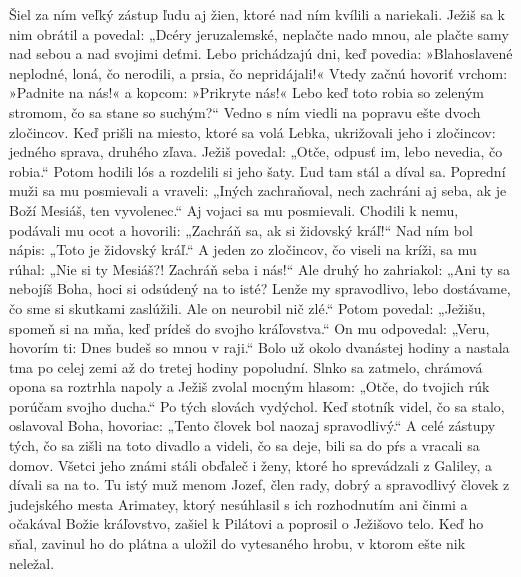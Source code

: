 Šiel za ním veľký zástup ľudu aj žien, ktoré nad ním kvílili a nariekali. Ježiš sa k nim obrátil a povedal: „Dcéry jeruzalemské, neplačte nado mnou, ale plačte samy nad sebou a nad svojimi deťmi. Lebo prichádzajú dni, keď povedia: »Blahoslavené neplodné, loná, čo nerodili, a prsia, čo nepridájali!«
Vtedy začnú hovoriť vrchom: »Padnite na nás!« a kopcom: »Prikryte nás!« 
Lebo keď toto robia so zeleným stromom, čo sa stane so suchým?“
Vedno s ním viedli na popravu ešte dvoch zločincov.
\versseparator
Keď prišli na miesto, ktoré sa volá Lebka, ukrižovali jeho i zločincov: jedného sprava, druhého zľava. Ježiš povedal: „Otče, odpusť im, lebo nevedia, čo robia.“
Potom hodili lós a rozdelili si jeho šaty. 
Ľud tam stál a díval sa. Poprední muži sa mu posmievali a vraveli: „Iných zachraňoval, nech zachráni aj seba, ak je Boží Mesiáš, ten vyvolenec.“ Aj vojaci sa mu posmievali. Chodili k nemu, podávali mu ocot a hovorili: „Zachráň sa, ak si židovský kráľ!“ Nad ním bol nápis: „Toto je židovský kráľ.“
\versseparator
A jeden zo zločincov, čo viseli na kríži, sa mu rúhal: „Nie si ty Mesiáš?! Zachráň seba i nás!“ Ale druhý ho zahriakol: „Ani ty sa nebojíš Boha, hoci si odsúdený na to isté? Lenže my spravodlivo, lebo dostávame, čo sme si skutkami zaslúžili. Ale on neurobil nič zlé.“ Potom povedal: „Ježišu, spomeň si na mňa, keď prídeš do svojho kráľovstva.“ On mu odpovedal: „Veru, hovorím ti: Dnes budeš so mnou v raji.“
\versseparator
Bolo už okolo dvanástej hodiny a nastala tma po celej zemi až do tretej hodiny popoludní. Slnko sa zatmelo, chrámová opona sa roztrhla napoly a Ježiš zvolal mocným hlasom: „Otče, do tvojich rúk porúčam svojho ducha.“ Po tých slovách vydýchol.
\versseparator
Keď stotník videl, čo sa stalo, oslavoval Boha, hovoriac: „Tento človek bol naozaj spravodlivý.“ A celé zástupy tých, čo sa zišli na toto divadlo a videli, čo sa deje, bili sa do pŕs a vracali sa domov.
Všetci jeho známi stáli obďaleč i ženy, ktoré ho sprevádzali z Galiley, a dívali sa na to.
\versseparator
Tu istý muž menom Jozef, člen rady, dobrý a spravodlivý človek z judejského mesta Arimatey, ktorý nesúhlasil s ich rozhodnutím ani činmi a očakával Božie kráľovstvo, zašiel k Pilátovi a poprosil o Ježišovo telo. Keď ho sňal, zavinul ho do plátna a uložil do vytesaného hrobu, v ktorom ešte nik neležal.